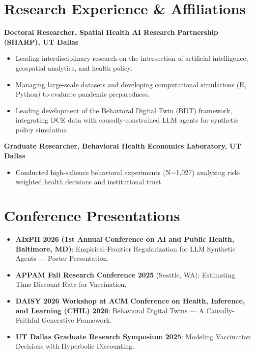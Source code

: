 \documentclass[11pt, letterpaper]{article}
\begin{document}
\section*{Research Experience \& Affiliations}
\textbf{Doctoral Researcher, Spatial Health AI Research Partnership (SHARP), UT Dallas} \\
\begin{itemize}[noitemsep, topsep=0pt, label={-}]
    \item Leading interdisciplinary research on the intersection of artificial intelligence, geospatial analytics, and health policy.
    \item Managing large-scale datasets and developing computational simulations (R, Python) to evaluate pandemic preparedness.
    \item Leading development of the Behavioral Digital Twin (BDT) framework, integrating DCE data with causally-constrained LLM agents for synthetic policy simulation.
\end{itemize}

\vspace{0.5em}
\noindent \textbf{Graduate Researcher, Behavioral Health Economics Laboratory, UT Dallas} \\
\begin{itemize}[noitemsep, topsep=0pt, label={-}]
    \item Conducted high-salience behavioral experiments (N=1,027) analyzing risk-weighted health decisions and institutional trust.
\end{itemize}

\section*{Conference Presentations}
\begin{itemize}[noitemsep, topsep=0pt]
    \item \textbf{AIxPH 2026 (1st Annual Conference on AI and Public Health, Baltimore, MD)}: Empirical-Frontier Regularization for LLM Synthetic Agents — Poster Presentation.
    \item \textbf{APPAM Fall Research Conference 2025} (Seattle, WA): Estimating Time Discount Rate for Vaccination.
    \item \textbf{DAISY 2026 Workshop at ACM Conference on Health, Inference, and Learning (CHIL) 2026}: Behavioral Digital Twins --- A Causally-Faithful Generative Framework.
    \item \textbf{UT Dallas Graduate Research Symposium 2025}: Modeling Vaccination Decisions with Hyperbolic Discounting.
\end{itemize}
\end{document}
